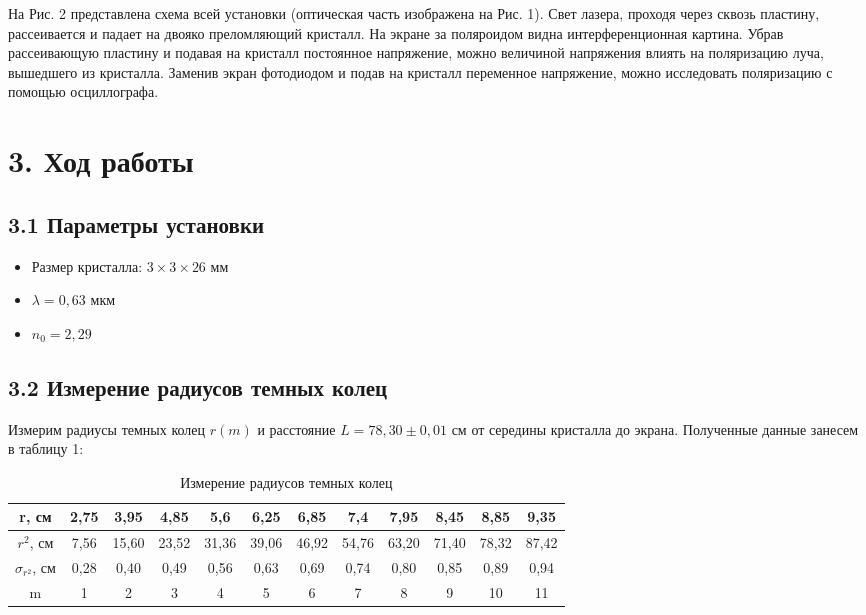 \documentclass[a4paper,12pt]{report}
\begin{document}
На Рис. 2 представлена схема всей установки (оптическая часть изображена на Рис. 1). Свет лазера, проходя через сквозь пластину, рассеивается и падает на двояко преломляющий кристалл. На экране за поляроидом видна интерференционная картина. Убрав рассеивающую пластину и подавая на кристалл постоянное напряжение, можно величиной напряжения влиять на поляризацию луча, вышедшего из кристалла. Заменив экран фотодиодом и подав на кристалл переменное напряжение, можно исследовать поляризацию с помощью осциллографа.

\section*{3. Ход работы}
\subsection*{3.1 Параметры установки }
\begin{itemize}
    \item Размер кристалла: $ 3\times 3\times 26$ мм
    \item $\lambda = 0,63$ мкм
    \item $n_{0} = 2,29$
\end{itemize}

\subsection*{3.2 Измерение радиусов темных колец }

Измерим радиусы темных колец $r(m)$ и расстояние $L = 78,30 \pm 0,01$ см от середины кристалла до экрана. Полученные данные занесем в таблицу 1:

\begin{table}[H]
\begin{tabular}{|c|c|c|c|c|c|c|c|c|c|c|c|}
\hline
r, см                          & 2,75 & 3,95  & 4,85  & 5,6   & 6,25  & 6,85  & 7,4   & 7,95  & 8,45  & 8,85  & 9,35  \\ \hline
$r^{2}$, см       & 7,56 & 15,60 & 23,52 & 31,36 & 39,06 & 46,92 & 54,76 & 63,20 & 71,40 & 78,32 & 87,42 \\ \hline
$\sigma_{r^2}$, см & 0,28 & 0,40  & 0,49  & 0,56  & 0,63  & 0,69  & 0,74  & 0,80  & 0,85  & 0,89  & 0,94  \\ \hline
m                              & 1    & 2     & 3     & 4     & 5     & 6     & 7     & 8     & 9     & 10    & 11    \\ \hline
\end{tabular}
\caption{Измерение радиусов темных колец}
\end{table}
\end{document}
